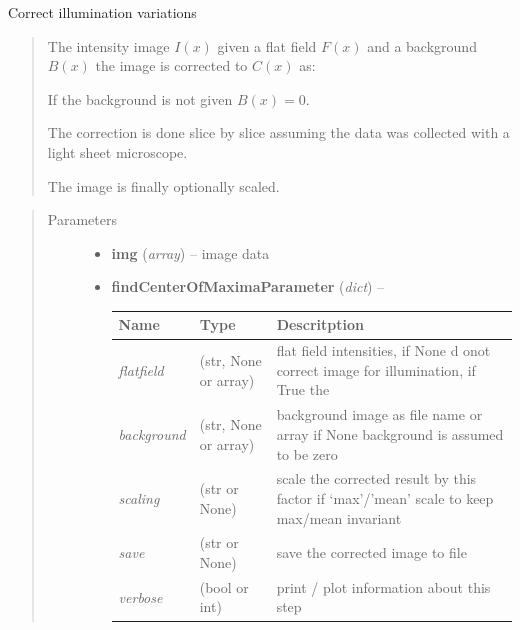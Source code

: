 \documentclass[letterpaper,10pt,english]{sphinxmanual}
\begin{document}
\begin{fulllineitems}
\label{api/ClearMap.ImageProcessing:ClearMap.ImageProcessing.IlluminationCorrection.correctIllumination}
Correct illumination variations
\begin{quote}

The intensity image $I(x)$ given a flat field $F(x)$ and
a background $B(x)$ the image is corrected to $C(x)$ as:

If the background is not given $B(x) = 0$.

The correction is done slice by slice assuming the data was collected with
a light sheet microscope.

The image is finally optionally scaled.
\end{quote}
\begin{quote}\begin{description}
\item[{Parameters}] \leavevmode\begin{itemize}
\item {} 
\textbf{img} (\emph{array}) --
image data

\item {} 
\textbf{findCenterOfMaximaParameter} (\emph{dict}) --

\begin{tabulary}{\linewidth}{|L|L|L|}
\hline
\textsf{\relax 
Name
} & \textsf{\relax 
Type
} & \textsf{\relax 
Descritption
}\\
\hline
\emph{flatfield}
 & 
(str, None or array)
 & 
flat field intensities, if None d onot correct image for
illumination, if True the
\\
\hline
\emph{background}
 & 
(str, None or array)
 & 
background image as file name or array
if None background is assumed to be zero
\\
\hline
\emph{scaling}
 & 
(str or None)
 & 
scale the corrected result by this factor
if `max'/'mean' scale to keep max/mean invariant
\\
\hline
\emph{save}
 & 
(str or None)
 & 
save the corrected image to file
\\
\hline
\emph{verbose}
 & 
(bool or int)
 & 
print / plot information about this step
\\
\hline\end{tabulary}



\end{itemize}
\end{description}
\end{quote}
\end{fulllineitems}
\end{document}
